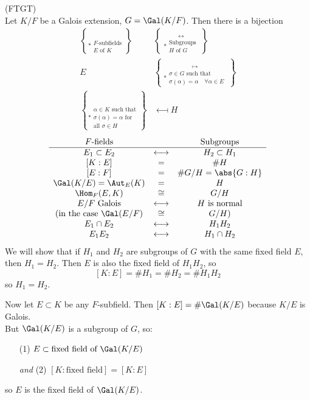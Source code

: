 \thm (FTGT) \\
Let $K/F$ be a Galois extension, $G=\Gal(K/F)$.  Then there is a bijection
\begin{align*}
\brace*{\substack{\text{$F$-subfields}\\\text{$E$ of $K$}}} &\longleftrightarrow \brace*{\substack{\text{Subgroups}\\\text{$H$ of $G$}}} \\
E &\longmapsto \brace*{\substack{\text{$\sigma\in G$ such that}\\\sigma(\alpha)=\alpha\quad\forall\alpha\in E}} \\
\brace*{\substack{\text{$\alpha\in K$ such that}\\\text{$\sigma(\alpha)=\alpha$ for}\\\text{all $\sigma\in H$}}} &\longmapsfrom H
\end{align*}
\[ \begin{array}{ccc}
\text{$F$-fields} && \text{Subgroups} \\ \hline
E_1 \subset E_2 & \longleftrightarrow & H_2 \subset H_1 \\{}
[K:E] & = & \# H \\{}
[E:F] & = & \# G / H = \abs{G:H} \\
\Gal(K/E) = \Aut_E(K) & = & H \\
\Hom_F(E,K) & \cong & G/H \\
\text{$E/F$ Galois} & \longleftrightarrow & \text{$H$ is normal} \\
\text{(in the case $\Gal(E/F)$} & \cong & \text{$G/H$)} \\
E_1 \cap E_2 & \longleftrightarrow & H_1 H_2 \\
E_1 E_2 & \longleftrightarrow & H_1 \cap H_2
\end{array} \]
\pf We will show that if $H_1$ and $H_2$ are subgroups of $G$ with the same fixed field $E$, then $H_1=H_2$.  Then $E$ is also the fixed field of $H_1H_2$, so
\[ [K:E] = \# H_1 = \# H_2 = \# H_1 H_2 \]
so $H_1=H_2$.

Now let $E\subset K$ be any $F$-subfield.  Then $[K:E]=\#\Gal(K/E)$ because $K/E$ is Galois. \\
But $\Gal(K/E)$ is a subgroup of $G$, so:
\begin{enumerate}
\item[(1)] $E\subset\text{fixed field of $\Gal(K/E)$}$
\item[\emph{and} (2)] $[K:\text{fixed field}]=[K:E]$
\end{enumerate}
so $E$ is the fixed field of $\Gal(K/E)$.

